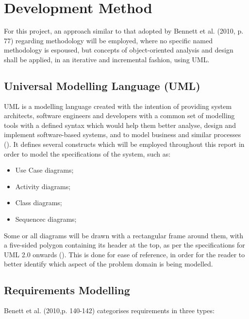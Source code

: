 \section{Development Method} \label{sec:DevelopmentMethod}
For this project, an approach similar to that adopted by Bennett et al. (2010,
p. 77) \nocite{bennett2010object} regarding methodology will be employed, where
no specific named methodology is espoused, but concepts of object-oriented
analysis and design shall be applied, in an iterative and incremental fashion,
using UML.

\subsection{Universal Modelling Language (UML)}
\label{sec:Introduction.methodology.uml}

UML is a modelling language created with the intention of providing system
architects, software engineers and developers with a common set of modelling
tools with a defined syntax which would help them better analyse, design and
implement software-based systems, and to model business and similar processes
(\cite[][p.~43]{omg2015uml}). It defines several constructs which will be
employed throughout this report in order to model the specifications of the
system, such as:
\begin{itemize}
  \item
    Use Case diagrams;

  \item
    Activity diagrams;

  \item
    Class diagrams;
    
  \item
    Sequencec diagrams;
\end{itemize}

Some or all diagrams will be drawn with a rectangular frame around them, with a
five-sided polygon containing its header at the top, as per the specifications
for UML 2.0 onwards (\cite[][p.~125]{bennett2010object}). This is done for ease
of reference, in order for the reader to better identify which aspect of the
problem domain is being modelled.


\subsection{Requirements Modelling} \label{sec:DevelopmentMethod.requirementsModelling}
Benett et al. (2010,p. 140-142) \nocite{bennett2010object} categorises
requirements in three types:

